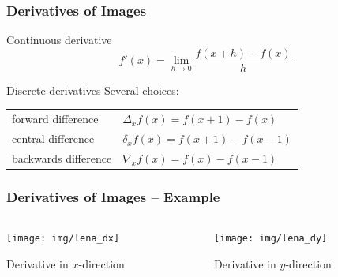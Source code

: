 \begin{frame}
    \frametitle{Derivatives of Images}
    \begin{block}{Continuous derivative}
        \begin{equation*}
            f'(x) = \lim_{h\rightarrow0}\frac{f(x+h)-f(x)}{h}
        \end{equation*}
    \end{block}
    \begin{block}{Discrete derivatives}
        Several choices:

        \begin{center}
            \begin{tabularx}{0.8\textwidth}{lX}
                forward difference                    & $\Delta_x f(x) = f(x+1) - f(x)$   \\
                \rule{0pt}{1.5em}central difference   & $\delta_x f(x) = f(x+1) - f(x-1)$ \\
                \rule{0pt}{1.5em}backwards difference & $\nabla_x f(x) = f(x) - f(x-1)$
            \end{tabularx}
        \end{center}
    \end{block}
\end{frame}

\begin{frame}
    \frametitle{Derivatives of Images -- Example}
    \begin{columns}[T, onlytextwidth]
        \begin{column}{0.5\textwidth}\centering
            \texttt{[image: img/lena\_dx]}

            Derivative in $x$-direction
        \end{column}
        \begin{column}{0.5\textwidth}\centering
            \texttt{[image: img/lena\_dy]}

            Derivative in $y$-direction
        \end{column}
    \end{columns}
\end{frame}

